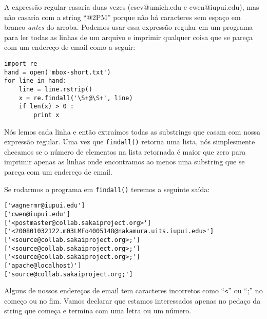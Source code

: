 A expressão regular casaria duas vezes (csev@umich.edu e cwen@iupui.edu), mas
não casaria com a string ``@2PM'' porque não há caracteres sem espaço em
branco {\em antes} do arroba. Podemos usar essa expressão regular em um
programa para ler todas as linhas de um arquivo e imprimir qualquer coisa que
se pareça com um endereço de email como a seguir: 

\beforeverb
\begin{verbatim}
import re
hand = open('mbox-short.txt')
for line in hand:
    line = line.rstrip()
    x = re.findall('\S+@\S+', line)
    if len(x) > 0 :
        print x
\end{verbatim}
\afterverb
%

Nós lemos cada linha e então extraímos todas as substrings que casam com
nossa expressão regular. Uma vez que {\tt findall()} retorna uma lista, nós
simplesmente checamos se o número de elementos na lista retornada é maior que
zero para imprimir apenas as linhas onde encontramos ao menos uma substring
que se pareça com um endereço de email.

Se rodarmos o programa em {\tt findall()} teremos a seguinte saída:

\beforeverb
\begin{verbatim}
['wagnermr@iupui.edu']
['cwen@iupui.edu']
['<postmaster@collab.sakaiproject.org>']
['<200801032122.m03LMFo4005148@nakamura.uits.iupui.edu>']
['<source@collab.sakaiproject.org>;']
['<source@collab.sakaiproject.org>;']
['<source@collab.sakaiproject.org>;']
['apache@localhost)']
['source@collab.sakaiproject.org;']
\end{verbatim}
\afterverb
%

Alguns de nossos endereços de email tem caracteres incorretos como
``\verb"<"'' ou ``;'' no começo ou no fim. Vamos declarar que estamos
interessados apenas no pedaço da string que começa e termina com uma letra
ou um número.

